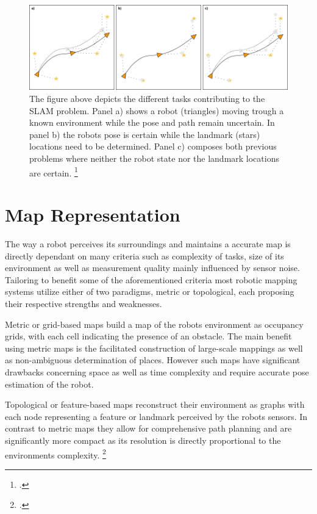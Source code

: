 \begin{figure}
	\centering
	\includegraphics[width=1.0\linewidth]{img/slamOverview}
	\caption{
		The figure above depicts the different tasks contributing to the SLAM problem. Panel a) shows a robot (triangles) moving trough a known environment while the pose and path remain uncertain. In panel b) the robots pose is certain while the landmark (stars) locations need to be determined. Panel c) composes both previous problems where neither the robot state nor the landmark locations are certain. \footcite{durrantSlam2006}
	}
	\label{fig:slamOverview}
\end{figure}

\section{Map Representation}
The way a robot perceives its surroundings and maintains a accurate map is directly dependant on many criteria such as complexity of tasks, size of its environment as well as measurement quality mainly influenced by sensor noise. 
Tailoring to benefit some of the aforementioned criteria most robotic mapping systems utilize either of two paradigms, metric or topological, each proposing their respective strengths and weaknesses.

Metric or grid-based maps build a map of the robots environment as occupancy grids, with each cell indicating the presence of an obstacle. The main benefit using metric maps is the facilitated construction of large-scale mappings as well as non-ambiguous determination of places. However such maps have significant drawbacks concerning space as well as time complexity and require accurate pose estimation of the robot.

Topological or feature-based maps reconstruct their environment as graphs with each node representing a feature or landmark perceived by the robots sensors. In contrast to metric maps they allow for comprehensive path planning and are significantly more compact as its resolution is directly proportional to the environments complexity. \footcite{thrunMaps1998}


